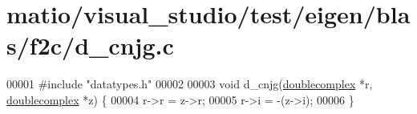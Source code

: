 \hypertarget{matio_2visual__studio_2test_2eigen_2blas_2f2c_2d__cnjg_8c_source}{}\section{matio/visual\+\_\+studio/test/eigen/blas/f2c/d\+\_\+cnjg.c}
\label{matio_2visual__studio_2test_2eigen_2blas_2f2c_2d__cnjg_8c_source}

\begin{DoxyCode}
00001 \textcolor{preprocessor}{#include "datatypes.h"}    
00002 
00003 \textcolor{keywordtype}{void} d\_cnjg(\hyperlink{structdoublecomplex}{doublecomplex} *r, \hyperlink{structdoublecomplex}{doublecomplex} *z) \{
00004     r->r = z->r;
00005     r->i = -(z->i);
00006 \}
\end{DoxyCode}
